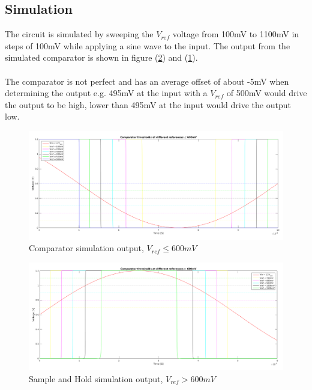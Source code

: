 \documentclass[english, 12pt, a4paper]{ifimaster}
\begin{document}
\subsection{Simulation}
The circuit is simulated by sweeping the \(V_{ref}\) voltage from 100mV to 1100mV in steps of 100mV while applying a sine wave to the input.
The output from the simulated comparator is shown in figure (\ref{figure:comparator:sim_output_greater}) and (\ref{figure:comparator:sim_output_less}).\\
\\
The comparator is not perfect and has an average offset of about -5mV when determining the output e.g. 495mV at the input with a \(V_{ref}\) of 500mV would drive the output to be high,
lower than 495mV at the input would drive the output low.\\

\begin{figure}[!ht]
    \centering
    \includegraphics[width=\textwidth]{img/comparator/comparator_r2r_less_600m_10k_scaled}
    \caption{Comparator simulation output, \(V_{ref} \leq 600mV\) }
    \label{figure:comparator:sim_output_less}
\end{figure}

\begin{figure}[!ht]
    \centering
    \includegraphics[width=\textwidth]{img/comparator/comparator_r2r_greater_600m_10k_scaled}
    \caption{Sample and Hold simulation output, \(V_{ref} > 600mV\)}
    \label{figure:comparator:sim_output_greater}
\end{figure}
\end{document}
